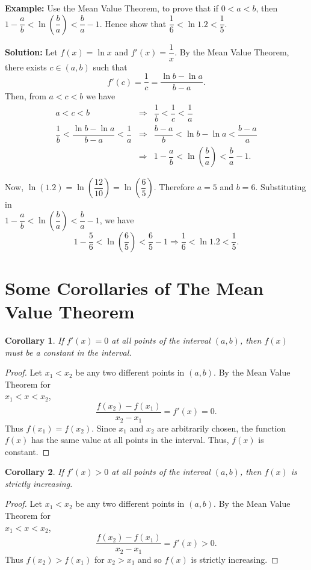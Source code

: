 \documentclass[titlepage,a4paper,12pt]{report}
\newtheorem{corollary}{Corollary}[section]
\begin{document}
 \noindent \textbf{Example:} Use the Mean Value Theorem, to prove that if $0<a<b$, then $1-\dfrac{a}{b}<\ln \left(\dfrac{b}{a}\right)<\dfrac{b}{a}-1$. Hence show that $\dfrac{1}{6}<\ln 1.2 < \dfrac{1}{5}$.
 
 \noindent \textbf{Solution:} Let $f(x)=\ln x$ and $f'(x)=\dfrac{1}{x}$. By the Mean Value Theorem, there exists $c\in (a,b)$ such that 
 \begin{equation*}
f'(c)=\dfrac{1}{c}=\dfrac{\ln b -\ln a}{b-a}. 
 \end{equation*}
 Then, from $a<c<b$ we have
 \begin{eqnarray*}
 a<c<b  &\Longrightarrow & \dfrac{1}{b}< \dfrac{1}{c} <\dfrac{1}{a} \\
 \dfrac{1}{b} <\dfrac{\ln b -\ln a}{b-a} <\dfrac{1}{a} &\Longrightarrow & \dfrac{b-a}{b}<\ln b -\ln a < \dfrac{b-a}{a}\\
 &\Longrightarrow & 1-\dfrac{a}{b}<\ln \left(\dfrac{b}{a}\right)<\dfrac{b}{a}-1.
 \end{eqnarray*}
 
\noindent Now, $\ln (1.2)=\ln \left(\dfrac{12}{10}\right)=\ln \left(\dfrac{6}{5} \right)$. Therefore $a=5$ and $b=6$. Substituting in \\$1-\dfrac{a}{b}<\ln \left(\dfrac{b}{a}\right)<\dfrac{b}{a}-1$, we have 
\begin{equation*}
1-\dfrac{5}{6}<\ln \left(\dfrac{6}{5}\right)<\dfrac{6}{5}-1 \Longrightarrow \dfrac{1}{6}<\ln 1.2 < \dfrac{1}{5}.
\end{equation*}
\section{Some Corollaries of The Mean Value Theorem}
\begin{corollary}
If $f'(x)=0$ at all points of the interval $(a,b)$, then $f(x)$ must be a constant in the interval.
\end{corollary}
\begin{proof}
Let $x_1<x_2$ be any two different points in $(a,b)$. By the Mean Value Theorem for\\
 $x_1<x<x_2$, 
\begin{equation*}
\dfrac{f(x_2)-f(x_1)}{x_2-x_1} =f'(x)=0.
\end{equation*} 
Thus $f(x_1)=f(x_2)$. Since $x_1$ and $x_2$ are arbitrarily chosen, the function $f(x)$ has the same value at all points in the interval. Thus, $f(x)$ is constant.
\end{proof}
\begin{corollary}
If $f'(x)>0$ at all points of the interval $(a,b)$, then $f(x)$ is strictly increasing.
\end{corollary}
\begin{proof}
Let $x_1<x_2$ be any two different points in $(a,b)$. By the Mean Value Theorem for\\ $x_1<x<x_2$, 
\begin{equation*}
\dfrac{f(x_2)-f(x_1)}{x_2-x_1} =f'(x)>0.
\end{equation*}
Thus $f(x_2)>f(x_1)$ for $x_2>x_1$ and so $f(x)$ is strictly increasing.
\end{proof}
\end{document}
